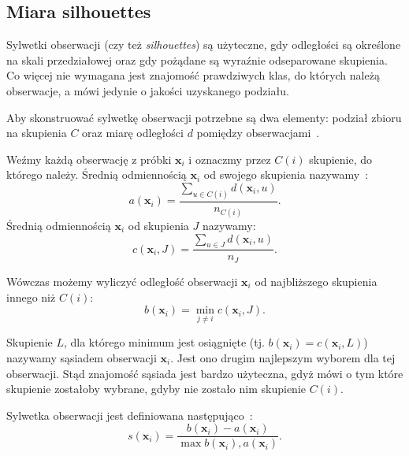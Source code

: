 \documentclass{praca1}
\begin{document}
\subsection{Miara silhouettes}

Sylwetki obserwacji (czy też \emph{silhouettes}) są użyteczne, gdy odległości są określone na skali przedziałowej oraz gdy pożądane są wyraźnie odseparowane skupienia. Co więcej nie wymagana jest znajomość prawdziwych klas, do których należą obserwacje, a mówi jedynie o jakości uzyskanego podziału.

Aby skonstruować sylwetkę obserwacji potrzebne są dwa elementy: podział zbioru na skupienia $C$ oraz miarę odległości $d$ pomiędzy obserwacjami~\cite{Rousseeuw1987:silhoutte}.

\begin{definition}
Weźmy każdą obserwację z próbki $\mathbf{x}_i$ i oznaczmy przez $C(i)$ skupienie, do którego należy. Średnią odmiennością $\mathbf{x}_i$ od swojego skupienia nazywamy~\cite{Rousseeuw1987:silhoutte}:
\begin{equation*}
a(\mathbf{x}_i) = \frac{\sum_{u \in C(i)} d(\mathbf{x}_i, u)}{n_{C(i)}}.
\end{equation*}
Średnią odmiennością $\mathbf{x}_i$ od skupienia $J$ nazywamy:
\begin{equation*}
c(\mathbf{x}_i, J) = \frac{\sum_{u \in J} d(\mathbf{x}_i, u)}{n_{J}}.
\end{equation*}
\end{definition}
Wówczas możemy wyliczyć odległość obserwacji $\mathbf{x}_i$ od najbliższego skupienia innego niż $C(i)$:
\begin{equation*}
b(\mathbf{x}_i) = \min\limits_{j \neq i} c(\mathbf{x}_i, J).
\end{equation*}


Skupienie $L$, dla którego minimum jest osiągnięte (tj. $b(\mathbf{x}_i) = c(\mathbf{x}_i, L)$) nazywamy sąsiadem obserwacji $\mathbf{x}_i$. Jest ono drugim najlepszym wyborem dla tej obserwacji. Stąd znajomość sąsiada jest bardzo użyteczna, gdyż mówi o tym które skupienie zostałoby wybrane, gdyby nie zostało nim skupienie $C(i)$.

\begin{definition}
Sylwetka obserwacji jest definiowana następująco~\cite{Rousseeuw1987:silhoutte}:
\begin{equation*}
s(\mathbf{x}_i) = \frac{b(\mathbf{x}_i) - a(\mathbf{x}_i)}{\max{b(\mathbf{x}_i), a(\mathbf{x}_i)}}.
\end{equation*}
\end{definition}
\end{document}

